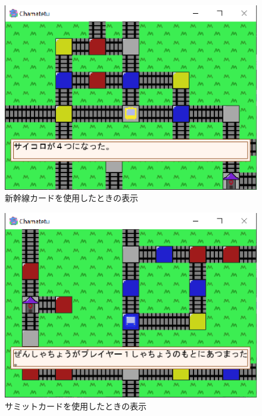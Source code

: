 \documentclass[a4j]{jarticle}
\begin{document}
            \begin{figure}[H]
                \centering
                \includegraphics[scale=1.3]{sinkansen.eps}
                \caption{新幹線カードを使用したときの表示}
                 \label{c3}
                \end{figure}

        \begin{figure}[H]
            \centering
            \includegraphics[scale=1.3]{samitto.eps}
            \caption{サミットカードを使用したときの表示}
             \label{c4}
            \end{figure}
            
\end{document}
